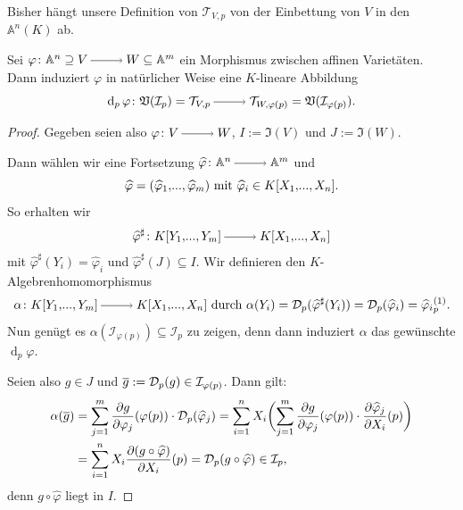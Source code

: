 \documentclass[a4paper,12pt,index=toc]{scrbook}
\theoremstyle{keinenummern} %
\def\A{\mathbb{A}}
\def\V{\mathfrak{V}}
\def\I{\mathfrak{I}}
\def\II{\mathcal{I}}
\newcommand{\DD}{\mathcal{D}} %
\def\T{\mathcal{T}}
\renewcommand{\dotsc}{\ensuremath{\!...}}
\newcommand{\dach}{\widehat}
\def\Bar#1{\ensuremath\overline{#1}}
\newcommand{\polyx}[1][n]{\ensuremath%
  [X_{1},\dotsc,X_{#1}]}
\begin{document}
\begin{w} Bisher hängt unsere Definition von $\T_{V,p}$ von der Einbettung von $V$ in den $\A^{n}(K)$ ab.\end{w}

\begin{bem}\label{3.3.6}
Sei $\varphi\colon\A^{n}\supseteq V\ra W\subseteq\A^{m}$ ein Morphismus zwischen affinen Varietäten. Dann induziert $\varphi$ in natürlicher Weise eine $K$-lineare Abbildung
\begin{equation*}\operatorname{d}_{p}\varphi\colon\V(\II_{p})=\T_{V,p}\ra\T_{W,\varphi(p)}=\V(\II_{\varphi(p)}).\end{equation*}
\end{bem}

\begin{proof}
Gegeben seien also $\varphi\colon V\ra W$, $I:=\I(V)$ und $J:=\I(W)$.

Dann wählen wir eine Fortsetzung $\dach{\varphi}\colon\A^{n}\ra\A^{m}$ und 
\begin{equation*}\dach{\varphi}=(\dach{\varphi}_{1},\dotsc,\dach{\varphi}_{m})\text{ mit }\dach{\varphi}_{i}\in K\polyx.\end{equation*} 
So erhalten wir
\begin{equation*}\dach{\varphi}^{\sharp}\colon K[Y_{1},\dotsc,Y_{m}]\ra K\polyx\end{equation*}
mit $\dach{\varphi}^{\sharp}(Y_{i})=\dach{\varphi}_{i}$ und $\dach{\varphi}^{\sharp}(J)\subseteq I$. Wir definieren den $K$-Algebrenhomomorphismus
\begin{equation*}\alpha\colon K[Y_{1},\dotsc,Y_{m}]\ra K\polyx\text{ durch }\alpha(Y_{i})=\DD_{p}(\dach{\varphi}^{\sharp}(Y_{i}))=\DD_{p}(\dach{\varphi}_{i})=\dach{\varphi}_{i}\mbox{}^{(1)}_{p}.\end{equation*}
Nun genügt es $\alpha(\II_{\varphi(p)})\subseteq\II_{p}$ zu zeigen, denn dann induziert $\alpha$ das gewünschte $\operatorname{d}_{p}\varphi$.

Seien also $g\in J$ und $\Bar{g}:=\DD_{p}(g)\in\II_{\varphi(p)}$. Dann gilt:
\begin{align*}
\alpha(\Bar{g})&=\sum_{j=1}^{m}\frac{\partial g}{\partial \varphi_{j}}(\varphi(p))\cdot \DD_{p}(\dach{\varphi}_{j})=\sum_{i=1}^{n}X_{i}\biggl(\sum_{j=1}^{m}\frac{\partial g}{\partial \varphi_{j}}(\varphi(p))\cdot\frac{\partial\dach{\varphi}_{j}}{\partial X_{i}}(p)\biggr)\\
&=\sum_{i=1}^{n}X_{i}\frac{\partial (g\circ \dach{\varphi})}{\partial X_{i}}(p)=\DD_{p}(g\circ\dach{\varphi})\in\II_{p},
\end{align*}
denn $g\circ\dach{\varphi}$ liegt in $I$.
\end{proof}
\end{document}
